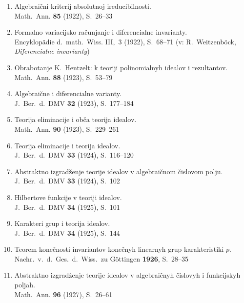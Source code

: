 \documentclass[11pt]{article}
\newcommand{\foreign}[1]{#1}
\begin{document}
\begin{enumerate}[label={\small\arabic*.},leftmargin=2em,itemsep=0.3em]
\item Algebraični kriterij absolutnoj ireducibilnosti.\\
\foreign{Math.\ Ann.} \textbf{85} (1922), S.~26--33

\item Formalno variacijsko računjanje i diferencialne invarianty.\\
\foreign{Encyklopädie d.\ math.\ Wiss.} III,\ 3 (1922), S.~68--71 (v:
\foreign{R.\ Weitzenböck}, \textit{Diferencialne invarianty})

\item Obrabotanje K.\ Hentzelt: k teoriji polinomialnyh idealov i rezultantov.\\
\foreign{Math.\ Ann.} \textbf{88} (1923), S.~53--79

\item Algebraične i diferencialne varianty.\\
\foreign{J.\ Ber.\ d.\ DMV} \textbf{32} (1923), S.~177--184

\item Teorija eliminacije i obča teorija idealov.\\
\foreign{Math.\ Ann.} \textbf{90} (1923), S.~229--261

\item Teorija eliminacije i teorija idealov.\\
\foreign{J.\ Ber.\ d.\ DMV} \textbf{33} (1924), S.~116--120

\item Abstraktno izgradženje teorije idealov v algebraičnom čislovom polju.\\
\foreign{J.\ Ber.\ d.\ DMV} \textbf{33} (1924), S.~102

\item Hilbertove funkcije v teoriji idealov.\\
\foreign{J.\ Ber.\ d.\ DMV} \textbf{34} (1925), S.~101

\item Karakteri grup i teorija idealov.\\
\foreign{J.\ Ber.\ d.\ DMV} \textbf{34} (1925), S.~144

\item Teorem konečnosti invariantov konečnyh linearnyh grup karakteristiki $p$.\\
\foreign{Nachr.\ v.\ d.\ Ges.\ d.\ Wiss.\ zu Göttingen} \textbf{1926}, S.~28--35

\item Abstraktno izgradženje teorije idealov v algebraičnyh čislovyh i funkcijskyh poljah.\\
\foreign{Math.\ Ann.} \textbf{96} (1927), S.~26--61


\end{enumerate}
\end{document}
